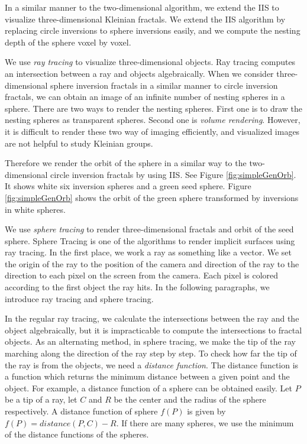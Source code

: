 \noindent In a similar manner to the two-dimensional algorithm,
we extend the IIS to visualize three-dimensional Kleinian fractals.
We extend the IIS algorithm by replacing circle inversions to sphere inversions easily, 
and we compute the nesting depth of the sphere voxel by voxel.

We use \textit{ray tracing} to visualize three-dimensional objects.
Ray tracing computes an intersection between a ray and objects
algebraically.
When we consider three-dimensional sphere inversion fractals in a similar
manner to circle inversion fractals, we can obtain an image of an
infinite number of nesting spheres in a sphere.
There are two ways to render the nesting spheres. First one is to draw
the nesting spheres as transparent spheres.
Second one is \textit{volume rendering}.
However, it is difficult to render these two way of imaging efficiently, and
visualized images are not helpful to study Kleinian groups.

Therefore we render the orbit of the sphere in a similar way to the
two-dimensional circle inversion fractals by using IIS.
See Figure \ref{fig:simpleGenOrb}. It shows
white six inversion spheres and a green seed sphere.
Figure \ref{fig:simpleGenOrb} shows the orbit of
the green sphere transformed by inversions in white spheres.

We use \textit{sphere tracing} \cite{hart1996sphere} to render three-dimensional
fractals and orbit of the seed sphere.
Sphere Tracing is one of the algorithms to render implicit surfaces using
ray tracing.
In the first place, we work a ray as something like a vector.
We set the origin of the ray to the position of the camera
and direction of the ray to the direction to each pixel on the screen
from the camera. Each pixel is colored according to the
first object the ray hits. 
In the following paragraphs, we introduce ray tracing and
sphere tracing.

In the regular ray tracing, we calculate the intersections between the
ray and the object algebraically, but
it is impracticable to compute the intersections to fractal objects.
As an alternating method, in sphere tracing, we make the tip of the
ray marching along the direction of the ray step by step. 
To check how far the tip of the ray is from the objects, we need a
\textit{distance function}.
The distance function is a function which returns the minimum distance
between a given point and the object.
For example, a distance function of a sphere can be obtained easily.
Let $P$ be a tip of a ray, let $C$ and $R$ be the center and the radius
of the sphere respectively.
A distance function of sphere $f(P)$ is given by $f(P) = distance(P, C) - R$.
If there are many spheres, we use the minimum of the distance functions
of the spheres.

